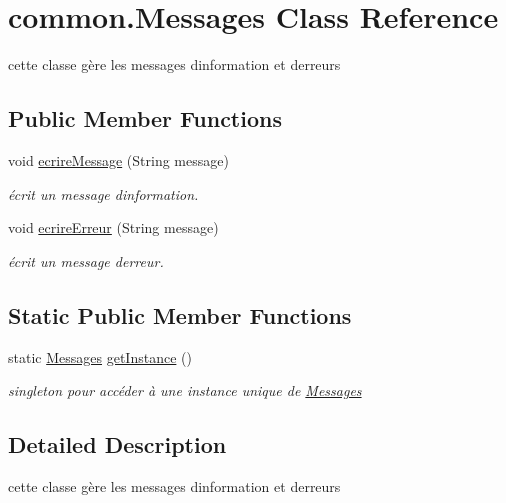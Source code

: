 \hypertarget{classcommon_1_1Messages}{}\section{common.\+Messages Class Reference}
\label{classcommon_1_1Messages}


cette classe gère les messages d\textquotesingle{}information et d\textquotesingle{}erreurs  


\subsection*{Public Member Functions}
\begin{DoxyCompactItemize}
\item 
void \hyperlink{classcommon_1_1Messages_a6069bc66b0eda8fdd5966a7c7a8a1a0a}{ecrire\+Message} (String message)
\begin{DoxyCompactList}\small\item\em écrit un message d\textquotesingle{}information. \end{DoxyCompactList}\item 
void \hyperlink{classcommon_1_1Messages_a5d8d6f3ce6024d78171f9e49de7f6136}{ecrire\+Erreur} (String message)
\begin{DoxyCompactList}\small\item\em écrit un message d\textquotesingle{}erreur. \end{DoxyCompactList}\end{DoxyCompactItemize}
\subsection*{Static Public Member Functions}
\begin{DoxyCompactItemize}
\item 
static \hyperlink{classcommon_1_1Messages}{Messages} \hyperlink{classcommon_1_1Messages_a96928a28b3f958fc717fca2c076f773c}{get\+Instance} ()
\begin{DoxyCompactList}\small\item\em singleton pour accéder à une instance unique de \hyperlink{classcommon_1_1Messages}{Messages} \end{DoxyCompactList}\end{DoxyCompactItemize}


\subsection{Detailed Description}
cette classe gère les messages d\textquotesingle{}information et d\textquotesingle{}erreurs 

